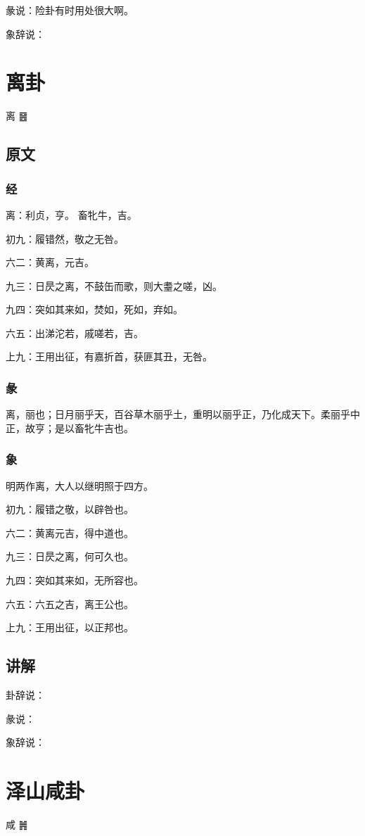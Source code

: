 \documentclass[12pt,oneside]{book}
\begin{document}
彖说：险卦有时用处很大啊。

象辞说：

\chapter{离卦}
离 {\Large ䷝}

\section{原文}


\subsection{经}
离：利贞，亨。 畜牝牛，吉。

初九：履错然，敬之无咎。

六二：黄离，元吉。

九三：日昃之离，不鼓缶而歌，则大耋之嗟，凶。

九四：突如其来如，焚如，死如，弃如。

六五：出涕沱若，戚嗟若，吉。

上九：王用出征，有嘉折首，获匪其丑，无咎。

\subsection{彖}
离，丽也；日月丽乎天，百谷草木丽乎土，重明以丽乎正，乃化成天下。柔丽乎中正，故亨；是以畜牝牛吉也。

\subsection{象}
明两作离，大人以继明照于四方。

初九：履错之敬，以辟咎也。

六二：黄离元吉，得中道也。

九三：日昃之离，何可久也。

九四：突如其来如，无所容也。

六五：六五之吉，离王公也。

上九：王用出征，以正邦也。

\section{讲解}
卦辞说：

彖说：

象辞说：

\chapter{泽山咸卦}
咸 {\Large ䷞}
\end{document}

